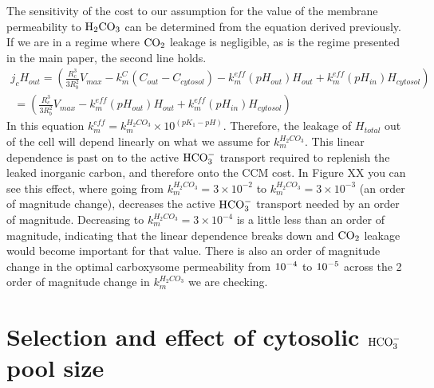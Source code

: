\documentclass[]{article}
\begin{document}
The sensitivity of the cost to our assumption for the value of the membrane permeability to  ${\rm H_2CO_3}$ can be determined from the equation derived previously. If we are in a regime where ${\rm CO_2}$ leakage is negligible, as is the regime presented in the main paper, the second line holds. 
\begin{multline}
j_c H_{out} =  \left(\frac{R_c^3}{3 R_b^2}  V_{max}  -k_m^C \left( C_{out} - C_{cytosol} \right) -k_m^{eff}(pH_{out}) H_{out} +k_m^{eff}(pH_{in})  H_{cytosol} \right) \\ 
\; = \left(\frac{R_c^3}{3 R_b^2}  V_{max}  - k_m^{eff}(pH_{out}) H_{out} + k_m^{eff}(pH_{in}) H_{cytosol} \right)
\end{multline}
In this equation $k_m^{eff} = k_m^{H_2CO_3} \times 10^{(pK_1 - pH)}$. Therefore, the leakage of ${H_{total}}$ out of the cell will depend linearly on what we assume for $ k_m^{H_2CO_3}$. This linear dependence is past on to the active ${\rm HCO_3^-}$ transport required to replenish the leaked inorganic carbon, and therefore onto the CCM cost. In Figure XX you can see this effect, where going from $ k_m^{H_2CO_3} = 3\times10^{-2}$ to $ k_m^{H_2CO_3} = 3\times10^{-3}$ (an order of magnitude change), decreases the active ${\rm HCO_3^-}$ transport needed by an order of magnitude. Decreasing  to $ k_m^{H_2CO_3} = 3\times10^{-4}$ is a little less than an order of magnitude, indicating that the linear dependence breaks down and ${\rm CO_2}$ leakage would become important for that value. There is also an order of magnitude change in the optimal carboxysome permeability from ${\rm 10^{-4}}$ to ${\rm 10^{-5}}$ across the 2 order of magnitude change in $ k_m^{H_2CO_3}$ we are checking.



\section{Selection and effect of cytosolic ${\rm HCO_3^-}$ pool size}
\end{document}

